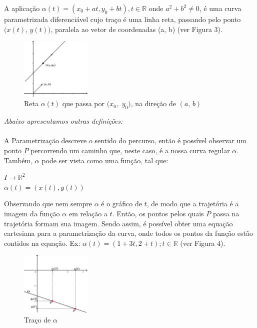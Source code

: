 \documentclass[twoside,a4paper,10pt]{article}
\newcommand{\R}{\mathbb R} %
\begin{document}
A aplicação $\alpha(t) = (x_{0}+at, y_{0}+bt), t \in \R$ onde $a^2 + b^2 \neq 0$, é uma curva parametrizada diferenciável cujo traço é uma linha reta, passando pelo ponto $(x(t)$, $y(t))$, paralela ao vetor de coordenadas (a, b) (ver Figura 3).

\begin{figure}[h!]
	\centering
	\includegraphics[width=0.3\textwidth]{p2}
	\caption{Reta $\alpha(t)$ que passa por $(x_{0},$ $y_{0})$, na direção de $(a,\,b)$}
\end{figure}

\emph{Abaixo apresentamos outras definições:}\\ \\

A Parametrização descreve o sentido do percurso, então é possível observar um ponto $P$ percorrendo um caminho que, neste caso, é a nossa curva regular $\alpha$. Também, $\alpha$ pode ser vista como uma função, tal que:

\begin{center}
	$I \rightarrow \R^2$ \\ $\alpha(t) = (x(t), y(t))$
\end{center}

Observando que nem sempre $\alpha$ é o gráfico de $t$, de modo que a trajetória é a imagem da função $\alpha$ em relação a $t$. Então, os pontos pelos quais $P$ passa na trajetória formam sua imagem. Sendo assim, é possível obter uma equação cartesiana para a parametrização da curva, onde todos os pontos da função estão contidos na equação. Ex: $\alpha(t) = (1+3t , 2+t); t\in \mathbb{R}$ (ver Figura 4).

\begin{figure}[h!]
	\centering
	\includegraphics[width=0.3\textwidth]{alpha}
	\caption{Traço de $\alpha$}
\end{figure}
\end{document}
